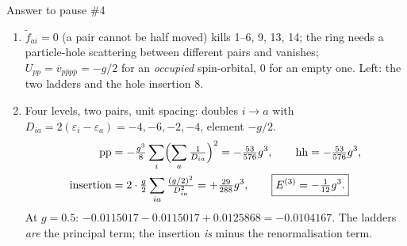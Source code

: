 \documentclass[aspectratio=169,10pt]{beamer}
\newcounter{thinkctr}
\newcommand{\thinka}[1]{%
  \vfill
  \begin{tcolorbox}[enhanced,colback=paleteal,colframe=teal,boxrule=1.2pt,arc=4pt,
    grow to left by=6mm,grow to right by=6mm,
    left=16pt,right=16pt,top=16pt,bottom=18pt,
    fonttitle=\bfseries\Large,fontupper=\large,
    title={Answer to pause \#\thethinkctr}]
  #1
  \end{tcolorbox}
  \vfill}
\newcommand{\vbar}[4]{\overline v_{#1#2#3#4}}
\newcommand{\ftil}[1]{\tilde f_{#1}}
\begin{document}
\begin{frame}[shrink=12]{Answer to pause \#4}
\thinka{%
\begin{enumerate}
\item \(\ftil{ai}=0\) (a pair cannot be half moved) kills 1--6, 9, 13, 14; the ring needs a particle-hole scattering between different pairs and vanishes; \(U_{pp}=\vbar{p}{\bar p}{p}{\bar p}=-g/2\) for an \emph{occupied} spin-orbital, \(0\) for an empty one. Left: the two ladders and the hole insertion 8.
\item Four levels, two pairs, unit spacing: doubles \(i\to a\) with \(D_{ia}=2(\varepsilon_i-\varepsilon_a)=-4,-6,-2,-4\), element \(-g/2\).
{\normalsize\begin{align*}
\text{pp}&=-\tfrac{g^3}{8}\sum_i\Bigl(\sum_a\tfrac1{D_{ia}}\Bigr)^2=-\tfrac{53}{576}g^3,\qquad
\text{hh}=-\tfrac{53}{576}g^3,\\
\text{insertion}&=2\cdot\tfrac g2\sum_{ia}\tfrac{(g/2)^2}{D_{ia}^2}=+\tfrac{29}{288}g^3,
\qquad \boxed{E^{(3)}=-\tfrac{1}{12}g^3.}
\end{align*}}
At \(g=0.5\): \(-0.0115017-0.0115017+0.0125868=-0.0104167\). The ladders \emph{are} the principal term; the insertion \emph{is} minus the renormalisation term.
\end{enumerate}}
\end{frame}
\end{document}
